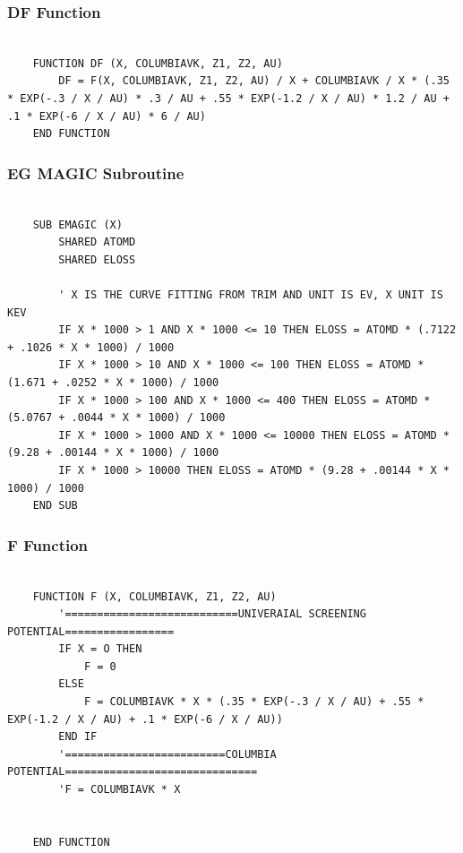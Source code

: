 \documentclass[10pt, reqno]{exam}
\begin{document}
\subsubsection{DF Function}

\begin{verbatim}

    FUNCTION DF (X, COLUMBIAVK, Z1, Z2, AU)
        DF = F(X, COLUMBIAVK, Z1, Z2, AU) / X + COLUMBIAVK / X * (.35 * EXP(-.3 / X / AU) * .3 / AU + .55 * EXP(-1.2 / X / AU) * 1.2 / AU + .1 * EXP(-6 / X / AU) * 6 / AU)
    END FUNCTION
\end{verbatim}

\subsubsection{EG MAGIC Subroutine}

\begin{verbatim}

    SUB EMAGIC (X)
        SHARED ATOMD
        SHARED ELOSS
    
        ' X IS THE CURVE FITTING FROM TRIM AND UNIT IS EV, X UNIT IS KEV
        IF X * 1000 > 1 AND X * 1000 <= 10 THEN ELOSS = ATOMD * (.7122 + .1026 * X * 1000) / 1000
        IF X * 1000 > 10 AND X * 1000 <= 100 THEN ELOSS = ATOMD * (1.671 + .0252 * X * 1000) / 1000
        IF X * 1000 > 100 AND X * 1000 <= 400 THEN ELOSS = ATOMD * (5.0767 + .0044 * X * 1000) / 1000
        IF X * 1000 > 1000 AND X * 1000 <= 10000 THEN ELOSS = ATOMD * (9.28 + .00144 * X * 1000) / 1000
        IF X * 1000 > 10000 THEN ELOSS = ATOMD * (9.28 + .00144 * X * 1000) / 1000
    END SUB
\end{verbatim}

\subsubsection{F Function}

\begin{verbatim}
    
    FUNCTION F (X, COLUMBIAVK, Z1, Z2, AU)
        '===========================UNIVERAIAL SCREENING POTENTIAL=================
        IF X = O THEN
            F = 0
        ELSE
            F = COLUMBIAVK * X * (.35 * EXP(-.3 / X / AU) + .55 * EXP(-1.2 / X / AU) + .1 * EXP(-6 / X / AU))
        END IF
        '=========================COLUMBIA POTENTIAL==============================
        'F = COLUMBIAVK * X
    
    
    END FUNCTION
\end{verbatim}
\end{document}
